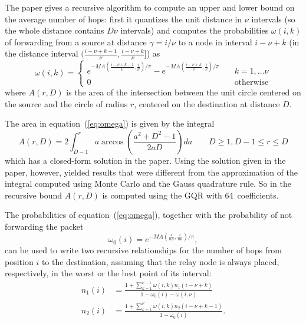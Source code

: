\documentclass[a4paper,oneside]{article}
\begin{document}
The paper gives a recursive algorithm to compute an upper and lower
bound on the average number of hops: first it quantizes the unit
distance in $\nu$ intervals (so the whole distance contains $D\nu$
intervals) and computes the probabilities $\omega(i,k)$ of forwarding
from a source at distance $\gamma = i/\nu$ to a node in interval $i -
\nu + k$ (in the distance interval $(\frac{i - \nu + k - 1}{\nu},
\frac{i - \nu + k}{\nu}]$) as
  \begin{equation}
    \omega(i, k) = \begin{cases}
      e^{-MA(\frac{i - \nu + k - 1}{\nu}, \frac{i}{\nu})/\pi}
      - e^{-MA(\frac{i - \nu + k}{\nu}, \frac{i}{\nu})/\pi}
      \quad & k = 1, \dots \nu \\
      0 & \text{otherwise}
    \end{cases}
    \label{eq:omega}
  \end{equation}
  where $A(r, D)$ is the area of the intersection between the unit
  circle centered on the source and the circle of radius $r$, centered
  on the destination at distance $D$.
  
The area in equation~(\ref{eq:omega}) is given by the integral
\begin{equation}
  A(r, D) = 2\int_{D-1}^r a \arccos\left( \frac{a^2 + D^2 - 1}{2aD} \right) da
  \qquad D \geq 1, D-1 \leq r \leq D  
\end{equation}
  which has a closed-form solution in the paper. Using the solution given
  in the paper, however, yielded results that were different from the
  approximation of the integral computed using Monte Carlo and the
  Gauss quadrature rule. So in the recursive bound $A(r, D)$ is
  computed using the GQR with 64~coefficients.

  The probabilities of equation~(\ref{eq:omega}), together with the
  probability of not forwarding the packet
  \begin{equation}
    \omega_0(i) = e^{-MA(\frac{i}{nu},\frac{i}{nu})/\pi} ,
  \end{equation}
  can be used to write two recursive relationships for the number of
  hops from position $i$ to the destination, assuming that the relay
  node is always placed, respectively, in the worst or the best point
  of its interval:
  \begin{align}
    n_1(i) &= \frac{
      1 + \sum_{k=1}^{\nu-1} \omega(i,k)n_1(i-\nu+k)
    }{
      1 - \omega_0(i) - \omega(i,\nu)
    }
    \label{eq:n1} \\
    n_2(i) &= \frac{
      1 + \sum_{k=1}^{\nu} \omega(i,k)n_2(i-\nu+k-1)
    }{
      1 - \omega_0(i)
    }
    \label{eq:n2}
    .
  \end{align}
\end{document}
